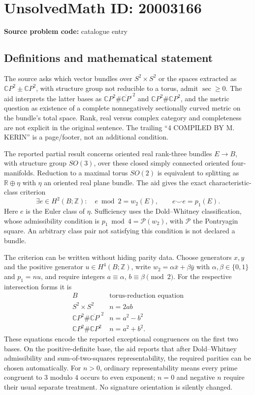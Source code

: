 \documentclass[11pt]{article}
\newcommand{\Z}{\mathbb{Z}}
\newcommand{\R}{\mathbb{R}}
\newcommand{\C}{\mathbb{C}}
\begin{document}
\section*{UnsolvedMath ID: 20003166}
\textbf{Source problem code:} catalogue entry
\subsection{Definitions and mathematical statement}
The source asks which vector bundles over $S^2\times S^2$ or the spaces extracted as $\C P^2\mathbin{\pm}\C P^2$, with structure group not reducible to a torus, admit $\sec\geq0$. The aid interprets the latter bases as $\C P^2\#\overline{\C P}^{,2}$ and $\C P^2\#\C P^2$, and the metric question as existence of a complete nonnegatively sectionally curved metric on the bundle's total space. Rank, real versus complex category and completeness are not explicit in the original sentence. The trailing ``4 COMPILED BY M. KERIN'' is a page/footer, not an additional condition.

The reported partial result concerns oriented real rank-three bundles $E\to B$, with structure group $SO(3)$, over these closed simply connected oriented four-manifolds. Reduction to a maximal torus $SO(2)$ is equivalent to splitting as $\R\oplus\eta$ with $\eta$ an oriented real plane bundle. The aid gives the exact characteristic-class criterion
\[
 \exists e\in H^2(B;\Z):\quad e\bmod2=w_2(E),\qquad
 e\smile e=p_1(E).
\]
Here $e$ is the Euler class of $\eta$. Sufficiency uses the Dold--Whitney classification, whose admissibility condition is $p_1\bmod4=\mathcal P(w_2)$, with $\mathcal P$ the Pontryagin square. An arbitrary class pair not satisfying this condition is not declared a bundle.

The criterion can be written without hiding parity data. Choose generators $x,y$ and the positive generator $u\in H^4(B;\Z)$, write $w_2=\alpha\bar x+\beta\bar y$ with $\alpha,\beta\in\{0,1\}$ and $p_1=nu$, and require integers $a\equiv\alpha$, $b\equiv\beta\pmod2$. For the respective intersection forms it is
\[
 \begin{array}{c|c}
 B&\text{torus-reduction equation}\\\hline
 S^2\times S^2&n=2ab\\
 \C P^2\#\overline{\C P}^{,2}&n=a^2-b^2\\
 \C P^2\#\C P^2&n=a^2+b^2.
 \end{array}
\]
These equations encode the reported exceptional congruences on the first two bases. On the positive-definite base, the aid reports that after Dold--Whitney admissibility and sum-of-two-squares representability, the required parities can be chosen automatically. For $n>0$, ordinary representability means every prime congruent to $3$ modulo $4$ occurs to even exponent; $n=0$ and negative $n$ require their usual separate treatment. No signature orientation is silently changed.
\end{document}
